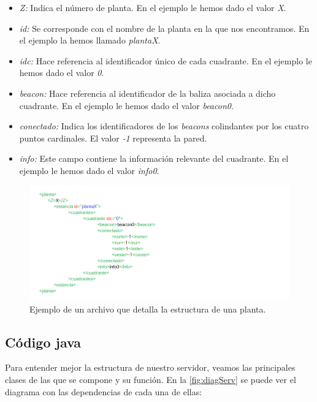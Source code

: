 \begin{itemize}
	\item \textit{Z:} Indica el número de planta. En el ejemplo le hemos dado el valor \textit{X}.
	\item \textit{id:} Se corresponde con el nombre de la planta en la que nos encontramos. En el ejemplo la hemos llamado \textit{plantaX}.
	\item \textit{idc:} Hace referencia al identificador único de cada cuadrante. En el ejemplo le hemos dado el valor \textit{0}.
	\item \textit{beacon:} Hace referencia al identificador de la baliza asociada a dicho cuadrante. En el ejemplo le hemos dado el valor \textit{beacon0}.
	\item \textit{conectado:} Indica los identificadores de los \textit{beacons} colindantes por los cuatro puntos cardinales. El valor \textit{-1} representa la pared.
	\item \textit{info:} Este campo contiene la información relevante del cuadrante. En el ejemplo le hemos dado el valor \textit{info0}.
	
\end{itemize}

\begin{figure}[t]
	\centering
	\includegraphics[width=1.1\textwidth]{Imagenes/Capitulo4/XMLPLANTA}
	\caption{Ejemplo de un archivo que detalla la estructura de una planta.}
	\label{fig:xmlplanta}
\end{figure}



\subsection{Código java}
Para entender mejor la estructura de nuestro servidor, veamos las principales clases de las que se compone y su función. En la \ref{fig:diagServ} se puede ver el diagrama con las dependencias de cada una de ellas:

